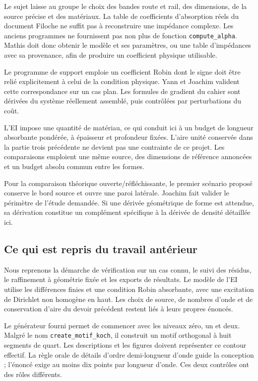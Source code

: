 \documentclass[11pt,a4paper]{article}
\begin{document}
Le sujet laisse au groupe le choix des bandes route et rail, des dimensions, de la source précise et des matériaux. La table de coefficients d'absorption réels du document Filoche ne suffit pas à reconstruire une impédance complexe. Les anciens programmes ne fournissent pas non plus de fonction {\small\ttfamily \nolinkurl{compute_alpha}}. Mathis doit donc obtenir le modèle et ses paramètres, ou une table d'impédances avec sa provenance, afin de produire un coefficient physique utilisable.

Le programme de support emploie un coefficient Robin dont le signe doit être relié explicitement à celui de la condition physique. Yann et Joachim valident cette correspondance sur un cas plan. Les formules de gradient du cahier sont dérivées du système réellement assemblé, puis contrôlées par perturbations du coût.

L'EI impose une quantité de matériau, ce qui conduit ici à un budget de longueur absorbante pondérée, à épaisseur et profondeur fixées. L'aire unité conservée dans la partie trois précédente ne devient pas une contrainte de ce projet. Les comparaisons emploient une même source, des dimensions de référence annoncées et un budget absolu commun entre les formes.

Pour la comparaison théorique ouverte/réfléchissante, le premier scénario proposé conserve le bord source et ouvre une paroi latérale. Joachim fait valider le périmètre de l'étude demandée. Si une dérivée géométrique de forme est attendue, sa dérivation constitue un complément spécifique à la dérivée de densité détaillée ici.

\subsection{Ce qui est repris du travail antérieur}

Nous reprenons la démarche de vérification sur un cas connu, le suivi des résidus, le raffinement à géométrie fixée et les exports de résultats. Le modèle de l'EI utilise les différences finies et une condition Robin absorbante, avec une excitation de Dirichlet non homogène en haut. Les choix de source, de nombres d'onde et de conservation d'aire du devoir précédent restent liés à leurs propres énoncés.

Le générateur fourni permet de commencer avec les niveaux zéro, un et deux. Malgré le nom {\small\ttfamily \nolinkurl{create_motif_koch}}, il construit un motif orthogonal à huit segments de quart. Les descriptions et les figures doivent représenter ce contour effectif. La règle orale de détails d'ordre demi-longueur d'onde guide la conception ; l'énoncé exige au moins dix points par longueur d'onde. Ces deux contrôles ont des rôles différents.
\end{document}
